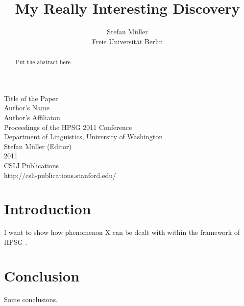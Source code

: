 \documentclass[11pt,a4paper,fleqn,draft]{article}
\title{My Really Interesting Discovery}
\author{Stefan M{\"u}ller\\
Freie Universit{\"a}t Berlin}
\begin{document}

\begin{center}
\Large
Title of the Paper\\[\baselineskip]

Author's Name\\[\baselineskip]
Author's Affiliaton\\[3\baselineskip]

                Proceedings of the HPSG 2011 Conference\\[\baselineskip]

                       Department of Linguistics, University of Washington\\[\baselineskip]

                        Stefan M{\"u}ller (Editor)\\[\baselineskip]

                                2011\\[\baselineskip]

                          CSLI Publications\\[\baselineskip]

              http://csli-publications.stanford.edu/

\end{center}

\newpage

\begin{abstract}
Put the abstract here.
\end{abstract}

\setcounter{footnote}{2}
\renewcommand{\thefootnote}{\fnsymbol{footnote}}
\renewcommand{\thefootnote}{\arabic{footnote}}
\setcounter{footnote}{0}


\section{Introduction}

I want to show how phenomenon X can be dealt with within the framework of HPSG
\citep{PS87a,PS94a}.

\section{Conclusion}

Some conclusions.



 

\end{document}
